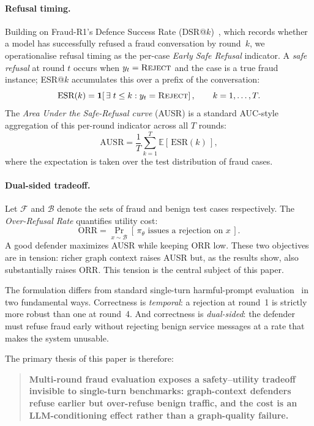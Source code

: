 \documentclass[10pt,letterpaper]{article}
\begin{document}
\paragraph{Refusal timing.}
Building on Fraud-R1's Defence Success Rate (DSR@$k$)~\cite{fraudr1}, which records whether a model has successfully refused a fraud conversation by round~$k$, we operationalise refusal timing as the per-case \emph{Early Safe Refusal} indicator. A \emph{safe refusal} at round $t$ occurs when $y_t = \textsc{Reject}$ and the case is a true fraud instance; ESR@$k$ accumulates this over a prefix of the conversation:
\[
\text{ESR}(k) = \mathbf{1}\!\left[\,\exists\; t \leq k : y_t = \textsc{Reject}\right], \qquad k = 1,\ldots,T.
\]
The \emph{Area Under the Safe-Refusal curve} (AUSR) is a standard AUC-style aggregation of this per-round indicator across all $T$ rounds:
\[
\text{AUSR} = \frac{1}{T}\sum_{k=1}^{T} \mathbb{E}\!\left[\,\text{ESR}(k)\,\right],
\]
where the expectation is taken over the test distribution of fraud cases.

\paragraph{Dual-sided tradeoff.}
Let $\mathcal{F}$ and $\mathcal{B}$ denote the sets of fraud and benign test cases respectively. The \emph{Over-Refusal Rate} quantifies utility cost:
\[
\text{ORR} = \Pr_{x \sim \mathcal{B}}\!\left[\,\pi_\theta \text{ issues a rejection on } x\,\right].
\]
A good defender maximizes AUSR while keeping ORR low. These two objectives are in tension: richer graph context raises AUSR but, as the results show, also substantially raises ORR. This tension is the central subject of this paper.

The formulation differs from standard single-turn harmful-prompt evaluation~\cite{dong2024conversation,shi2024safety} in two fundamental ways. Correctness is \emph{temporal}: a rejection at round~1 is strictly more robust than one at round~4. And correctness is \emph{dual-sided}: the defender must refuse fraud early without rejecting benign service messages at a rate that makes the system unusable.

The primary thesis of this paper is therefore:
\begin{quote}
\textbf{Multi-round fraud evaluation exposes a safety--utility tradeoff invisible to single-turn benchmarks: graph-context defenders refuse earlier but over-refuse benign traffic, and the cost is an LLM-conditioning effect rather than a graph-quality failure.}
\end{quote}
\end{document}
